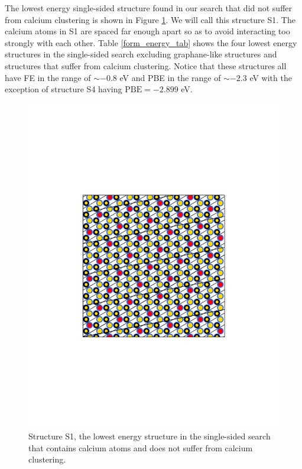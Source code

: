 \documentclass[oneside, noacknowlegments]{BYUPhys}
\begin{document}
The lowest energy single-sided structure found in our search that did not suffer from calcium clustering is shown in Figure \ref{fig:SLowest}. We will call this structure S1. The calcium atoms in S1 are spaced far enough apart so as to avoid interacting too strongly with each other. Table \ref{form_energy_tab} shows the four lowest energy structures in the single-sided search excluding graphane-like structures and structures that suffer from calcium clustering. Notice that these structures all have FE in the range of $\sim -0.8$ eV and PBE in the range of $\sim -2.3$ eV with the exception of structure S4 having $\mathrm{PBE} = -2.899$ eV.

\begin{figure}
	\centering
	\begin{minipage}{0.5\textwidth}
		\centering
		\includegraphics[width=\textwidth]{212}
	\end{minipage}
	\caption{Structure S1, the lowest energy structure in the 
		single-sided search that contains calcium atoms and does 
		not suffer from calcium clustering.}
	\label{fig:SLowest}
\end{figure}
\end{document}
